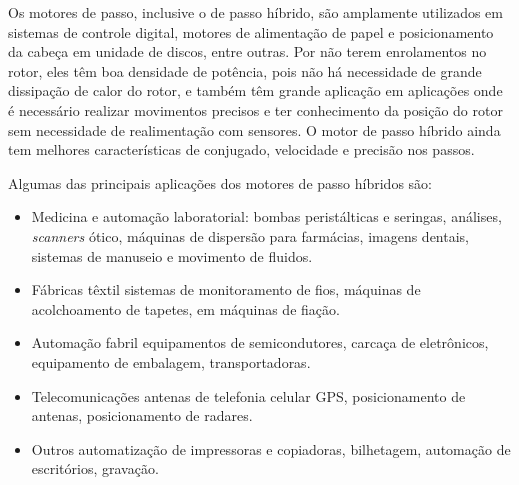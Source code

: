 Os motores de passo, inclusive o de passo híbrido, são amplamente utilizados em sistemas de controle digital, motores de alimentação de papel e posicionamento da cabeça em unidade de discos, entre outras. Por não terem enrolamentos no rotor, eles têm boa densidade de potência, pois não há necessidade de grande dissipação de calor do rotor, e também têm grande aplicação em aplicações onde é necessário realizar movimentos precisos e ter conhecimento da posição do rotor sem necessidade de realimentação com sensores. O motor de passo híbrido ainda tem melhores características de conjugado, velocidade e precisão nos passos. \cite{Fitz}

Algumas das principais aplicações dos motores de passo híbridos são: \cite{aplciacoes}

\begin{itemize}
	\item Medicina e automação laboratorial: 
	\subitem bombas peristálticas e seringas,
	\subitem análises,
	\subitem \textit{scanners} ótico,
	\subitem máquinas de dispersão para farmácias,
	\subitem imagens dentais,
	\subitem sistemas de manuseio e movimento de fluidos.
	\item Fábricas têxtil
	\subitem sistemas de monitoramento de fios,
	\subitem máquinas de acolchoamento de tapetes,
	\subitem em máquinas de fiação.
	\item Automação fabril
	\subitem equipamentos de semicondutores,
	\subitem carcaça de eletrônicos,
	\subitem equipamento de embalagem,
	\subitem transportadoras.
	\item Telecomunicações
	\subitem antenas de telefonia celular
	\subitem GPS,
	\subitem posicionamento de antenas,
	\subitem posicionamento de radares.
	\item Outros
	\subitem automatização de impressoras e copiadoras,
	\subitem bilhetagem,
	\subitem automação de escritórios,
	\subitem gravação.
\end{itemize}